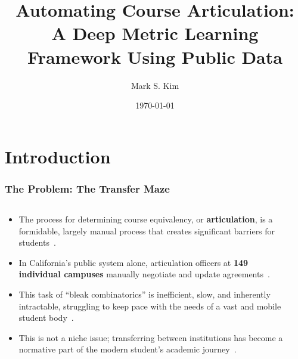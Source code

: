 \documentclass[aspectratio=169,10pt]{beamer}
\title[Automating Course Articulation]{Automating Course Articulation:\\A Deep Metric Learning Framework Using Public Data}
\author{Mark S. Kim}
\institute[SFSU]{San Francisco State University \\ Department of Data Science and Artificial Intelligence}
\date{\today}
\begin{document}
\section{Introduction}
\begin{frame}
    \titlepage
\end{frame}

\begin{frame}
    \frametitle{The Problem: The Transfer Maze}
    
    \begin{columns}[T] %
        
        \begin{column}{0.6\textwidth} %
            \begin{itemize}
                \item The process for determining course equivalency, or \textbf{articulation}, is a formidable, largely manual process that creates significant barriers for students~\cite{pardos2019}.
                
                \item In California's public system alone, articulation officers at \textbf{149 individual campuses} manually negotiate and update agreements~\cite{assistfaq, ppic, calstate, cccco}.
                
                \item This task of ``bleak combinatorics'' is inefficient, slow, and inherently intractable, struggling to keep pace with the needs of a vast and mobile student body~\cite{pardos2019}.
                
                \item This is not a niche issue; transferring between institutions has become a normative part of the modern student's academic journey~\cite{publicagenda2025}.
            \end{itemize}
        \end{column}
        
        \begin{column}{0.4\textwidth} %
            

\end{column}
\end{columns}
\end{frame}
\end{document}
